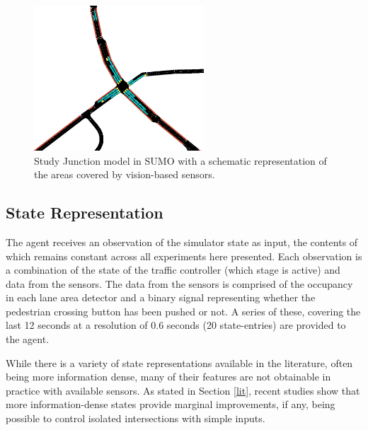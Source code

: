 \documentclass[conference]{IEEEtran}
\begin{document}
\begin{figure}                                                
\centering                                                    
\includegraphics[width=2.5in]{intersection}                                    
\caption{Study Junction model in SUMO with a schematic representation of the areas covered by vision-based sensors.}                                  
\label{intersection}                                               
\end{figure}     

\subsection{State Representation}
The agent receives an observation of the simulator state as input, the contents of which remains constant across all experiments here presented.
Each observation is a combination of the state of the traffic controller (which stage is active) and data from the sensors.
The data from the sensors is comprised of the occupancy in each lane area detector and a binary signal representing whether the pedestrian crossing button has been pushed or not.
A series of these, covering the last 12 seconds at a resolution of 0.6 seconds (20 state-entries) are provided to the agent.

While there is a variety of state representations available in the literature, often being more information dense, many of their features are not obtainable in practice with available sensors.
As stated in Section \ref{lit}, recent studies \cite{gendersstate} show that more information-dense states provide marginal improvements, if any, being possible to control isolated intersections with simple inputs.
\end{document}
